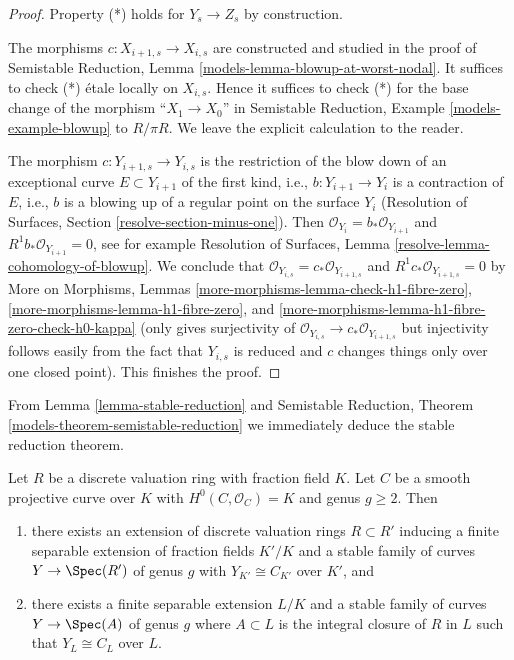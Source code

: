 \begin{proof}
\medskip\noindent
Property (*) holds for $Y_s \to Z_s$ by construction.

\medskip\noindent
The morphisms $c : X_{i + 1, s} \to X_{i, s}$ are constructed and studied
in the proof of
Semistable Reduction, Lemma \ref{models-lemma-blowup-at-worst-nodal}.
It suffices to check (*) \'etale locally on $X_{i, s}$.
Hence it suffices to check (*) for the base change of the morphism
``$X_1 \to X_0$'' in Semistable Reduction, Example \ref{models-example-blowup}
to $R/\pi R$.
We leave the explicit calculation to the reader.

\medskip\noindent
The morphism $c : Y_{i + 1, s} \to Y_{i, s}$ is the restriction
of the blow down of an exceptional curve $E \subset Y_{i + 1}$
of the first kind, i.e., $b : Y_{i + 1} \to Y_i$ is a contraction of $E$,
i.e., $b$ is a blowing up of a regular point on the surface $Y_i$
(Resolution of Surfaces, Section \ref{resolve-section-minus-one}).
Then $\mathcal{O}_{Y_i} = b_*\mathcal{O}_{Y_{i + 1}}$ and
$R^1b_*\mathcal{O}_{Y_{i + 1}} = 0$, see for example
Resolution of Surfaces, Lemma
\ref{resolve-lemma-cohomology-of-blowup}.
We conclude that $\mathcal{O}_{Y_{i, s}} = c_*\mathcal{O}_{Y_{i + 1, s}}$
and $R^1c_*\mathcal{O}_{Y_{i + 1, s}} = 0$ by
More on Morphisms, Lemmas \ref{more-morphisms-lemma-check-h1-fibre-zero},
\ref{more-morphisms-lemma-h1-fibre-zero}, and
\ref{more-morphisms-lemma-h1-fibre-zero-check-h0-kappa}
(only gives surjectivity of
$\mathcal{O}_{Y_{i, s}} \to c_*\mathcal{O}_{Y_{i + 1, s}}$ but
injectivity follows easily from the fact that $Y_{i, s}$ is reduced
and $c$ changes things only over one closed point).
This finishes the proof.
\end{proof}

\noindent
From Lemma \ref{lemma-stable-reduction} and
Semistable Reduction, Theorem \ref{models-theorem-semistable-reduction}
we immediately deduce the stable reduction theorem.

\begin{theorem}
\label{theorem-stable-reduction}
\begin{reference}
\cite[Corollary 2.7]{DM}
\end{reference}
Let $R$ be a discrete valuation ring with fraction field $K$. Let $C$ be a
smooth projective curve over $K$ with $H^0(C, \mathcal{O}_C) = K$
and genus $g \geq 2$. Then
\begin{enumerate}
\item there exists an extension of discrete valuation rings $R \subset R'$
inducing a finite separable extension of fraction fields $K'/K$ and
a stable family of curves $Y \to \Spec(R')$ of genus $g$ with
$Y_{K'} \cong C_{K'}$ over $K'$, and
\item there exists a finite separable extension $L/K$ and a stable
family of curves $Y \to \Spec(A)$ of genus $g$ where $A \subset L$
is the integral closure of $R$ in $L$ such that
$Y_L \cong C_L$ over $L$.
\end{enumerate}
\end{theorem}

